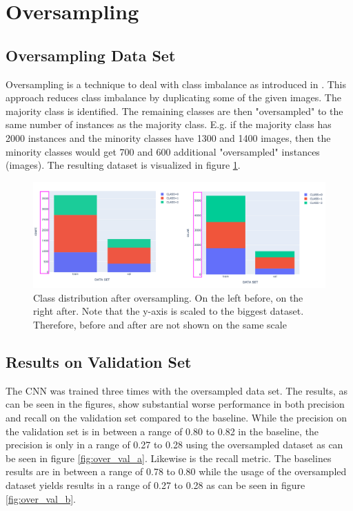 \section{Oversampling}

\subsection{Oversampling Data Set}
Oversampling is a technique to deal with class imbalance as introduced in \cite{bloem2020methology1}. This approach reduces class imbalance by duplicating some of the given images. The majority class is identified. The remaining classes are then "oversampled" to the same number of instances as the majority class. E.g. if the majority class has 2000 instances and the minority classes have 1300 and 1400 images, then the minority classes would get 700 and 600 additional "oversampled" instances (images). The resulting dataset is visualized in figure \ref{fig:oversampling_class_distribution}.

\begin{figure}[h]
    \centering
    \includegraphics[width=\linewidth]{figures/oversampling/class_distribution_before_after.png}
    \caption{Class distribution after oversampling. On the left before, on the right after. Note that the y-axis is scaled to the biggest dataset. Therefore, before and after are not shown on the same scale}
    \label{fig:oversampling_class_distribution}
\end{figure}

\subsection{Results on Validation Set}
The CNN was trained three times with the oversampled data set. The results, as can be seen in the figures, show substantial worse performance in both precision and recall on the validation set compared to the baseline. While the precision on the validation set is in between a range of 0.80 to 0.82 in the baseline, the precision is only in a range of 0.27 to 0.28 using the oversampled dataset as can be seen in figure \ref{fig:over_val_a}. Likewise is the recall metric. The baselines results are in between a range of 0.78 to 0.80 while the usage of the oversampled dataset yields results in a range of 0.27 to 0.28 as can be seen in figure \ref{fig:over_val_b}.

